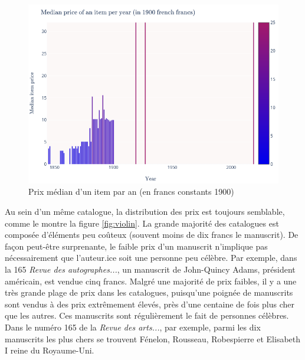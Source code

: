 \begin{figure}[!h]
	\includegraphics[width=\textwidth]{annexes/fig_med_itm.png}
	\caption{Prix médian d'un item par an (en francs constants 1900)}
	\label{fig:meditm}
\end{figure}

Au sein d'un même catalogue, la distribution des prix est toujours semblable, comme le montre la figure \ref{fig:violin}. La grande majorité des catalogues est composée d'éléments peu coûteux (souvent moins de dix francs le manuscrit). De façon peut-être surprenante, le faible prix d'un manuscrit n'implique pas nécessairement que l'auteur.ice soit une personne peu célèbre. Par exemple, dans la 165 \textit{Revue des autographes...}, un manuscrit de John-Quincy Adams, président américain, est vendue cinq francs. Malgré une majorité de prix faibles, il y a une très grande plage de prix dans les catalogues, puisqu'une poignée de manuscrits sont vendus à des prix extrêmement élevés, près d'une centaine de fois plus cher que les autres. Ces manuscrits sont régulièrement le fait de personnes célèbres. Dans le numéro 165 de la \textit{Revue des arts...}, par exemple, parmi les dix manuscrits les plus chers se trouvent Fénelon, Rousseau, Robespierre et Elisabeth I reine du Royaume-Uni.

